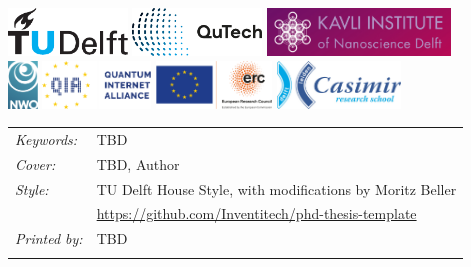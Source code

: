 \begin{titlepage}
\begin{center}
\noindent
\includegraphics[height=0.5in]{figures/logos/tudelft.pdf}
\hfill
\includegraphics[height=0.5in]{figures/logos/qutech.pdf}
\hfill
\includegraphics[height=0.5in]{figures/logos/kavli.pdf}
\\ \vspace{2\baselineskip}
\includegraphics[height=0.5in]{figures/logos/nwo.pdf}
\hfill
\includegraphics[height=0.5in]{figures/logos/qia.pdf}
\hfill
\includegraphics[height=0.5in]{figures/logos/erc.pdf}
\hfill
\includegraphics[height=0.5in]{figures/logos/casimir.pdf}
\end{center}

\vfill

\noindent
\begin{tabular}{@{}p{}@{}p{}}
    \textit{Keywords:} & TBD \\[\medskipamount]
    \textit{Cover:} & TBD, Author \\[\medskipamount]
    \textit{Style:} & TU Delft House Style, with modifications by Moritz Beller \\
    & \url{https://github.com/Inventitech/phd-thesis-template} \\[\medskipamount]
    \textit{Printed by:} & TBD \\
    & \\[\medskipamount]
\end{tabular}


\end{titlepage}
